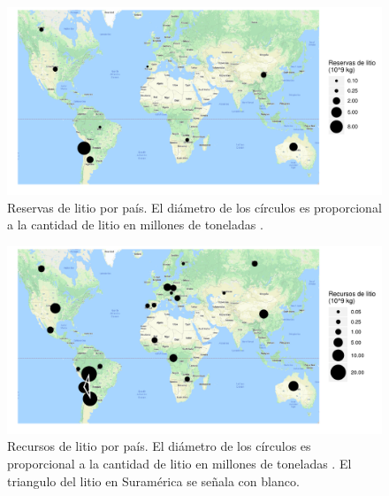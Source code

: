 \begin{figure}[H]
    \centering
    \includegraphics[width = \textwidth, trim = {1cm 1.2cm 0.4cm 0.5cm}, clip]{chap2/images/reserves.pdf}
    \caption[Reservas de litio por país.]{Reservas de litio por país. El diámetro de los círculos es proporcional a la cantidad de litio en millones de toneladas \citep{USGS2020}.}
    \label{fig:reservas}
\end{figure}
\begin{figure}[H]
    \centering
    \includegraphics[width = \textwidth, trim = {1cm 1.2cm 0.4cm 0.5cm}, clip]{chap2/images/resources.pdf}
    \caption[Recursos de litio por país.]{Recursos de litio por país. El diámetro de los círculos es proporcional a la cantidad de litio en millones de toneladas \citep{USGS2020}. El {triangulo del litio} en Suramérica se señala con blanco.}
    \label{fig:recursos}
\end{figure}

